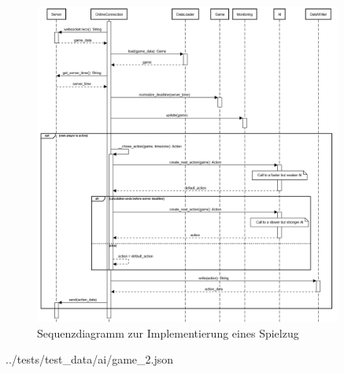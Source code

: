 \begin{figure}[htb]
	\centering
	\includegraphics[width=0.9\textwidth]{Bilder/Sequenzdiagramm_Implementierung_Spielzug.png}
	\caption{Sequenzdiagramm zur Implementierung eines Spielzug}
	\label{fig:sequenzdiagramm-spielzug}
\end{figure}

\begin{minipage}{\textwidth}
	
	{../tests/test_data/ai/game_2.json}
\end{minipage}

